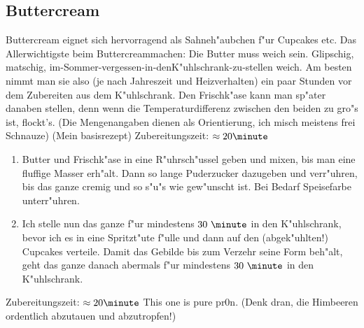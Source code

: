 \subsection{Buttercream}
Buttercream eignet sich hervorragend als Sahneh"aubchen f"ur Cupcakes etc.
Das Allerwichtigste beim Buttercreammachen: Die Butter muss weich sein. Glipschig, matschig, im-Sommer-vergessen-in-denK"uhlschrank-zu-stellen weich.
Am besten nimmt man sie also (je nach Jahreszeit und Heizverhalten) ein paar Stunden vor dem Zubereiten
aus dem K"uhlschrank. Den Frischk"ase kann man sp"ater danaben stellen, denn wenn die Temperaturdifferenz zwischen den beiden zu gro"s ist, flockt's.
(Die Mengenangaben dienen als Orientierung, ich misch meistens frei Schnauze)
(Mein basisrezept) \hfill Zubereitungszeit: $\approx20 \minute$

\begin{enumerate}
\item	Butter und Frischk"ase in eine R"uhrsch"ussel geben und mixen, bis man eine fluffige Masser erh"alt.
      Dann so lange Puderzucker dazugeben und verr"uhren, bis das ganze cremig und so s"u"s wie gew"unscht ist.
      Bei Bedarf Speisefarbe unterr"uhren.
\item	Ich stelle nun das ganze f"ur mindestens $30~\minute$ in den K"uhlschrank, bevor ich es in eine Spritzt"ute f"ulle
      und dann auf den (abgek"uhlten!) Cupcakes verteile. Damit das Gebilde bis zum Verzehr seine Form beh"alt,
      geht das ganze danach abermals f"ur mindestens $30~\minute$ in den K"uhlschrank.
\end{enumerate}

\hfill Zubereitungszeit: $\approx20 \minute$
This one is pure pr0n. (Denk dran, die Himbeeren ordentlich abzutauen und abzutropfen!)

